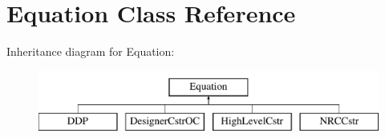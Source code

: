 \hypertarget{class_open_chams_1_1_equation}{\section{Equation Class Reference}
\label{class_open_chams_1_1_equation}
}
Inheritance diagram for Equation\-:\begin{figure}[H]
\begin{center}
\leavevmode
\includegraphics[height=2.000000cm]{class_open_chams_1_1_equation}
\end{center}
\end{figure}
